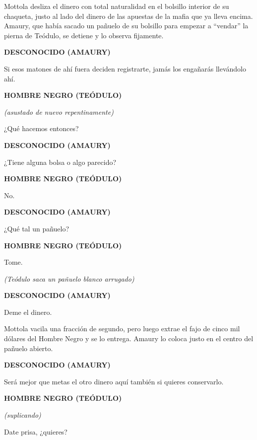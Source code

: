 \documentclass[11pt]{report}
\newenvironment{scenedesc}{\vspace{1em}\par\noindent\small\rmfamily}{\vspace{1em}}
\newenvironment{dialogue}[1]{
    \vspace{0.5em}\par\begin{center}\textbf{\MakeUppercase{#1}}\end{center}\vspace{-0.5em}
    \begin{list}{}{
        \leftmargin=1.5in
        \rightmargin=1.5in
        \parsep=0pt
    }\item[]
}{
    \end{list}\vspace{0.5em}
}
\newcommand{\parenthetical}[1]{\vspace{-0.3em}\begin{center}\textit{(#1)}\end{center}\vspace{-0.3em}}
\begin{document}
\begin{scenedesc}
Mottola desliza el dinero con total naturalidad en el bolsillo interior de su chaqueta, justo al lado del dinero de las apuestas de la mafia que ya lleva encima. Amaury, que había sacado un pañuelo de su bolsillo para empezar a ``vendar'' la pierna de Teódulo, se detiene y lo observa fijamente.
\end{scenedesc}

\begin{dialogue}{Desconocido (Amaury)}
Si esos matones de ahí fuera deciden registrarte, jamás los engañarás llevándolo ahí.
\end{dialogue}

\begin{dialogue}{Hombre Negro (Teódulo)}
\parenthetical{asustado de nuevo repentinamente}
¿Qué hacemos entonces?
\end{dialogue}

\begin{dialogue}{Desconocido (Amaury)}
¿Tiene alguna bolsa o algo parecido?
\end{dialogue}

\begin{dialogue}{Hombre Negro (Teódulo)}
No.
\end{dialogue}

\begin{dialogue}{Desconocido (Amaury)}
¿Qué tal un pañuelo?
\end{dialogue}

\begin{dialogue}{Hombre Negro (Teódulo)}
Tome.
\parenthetical{Teódulo saca un pañuelo blanco arrugado}
\end{dialogue}

\begin{dialogue}{Desconocido (Amaury)}
Deme el dinero.
\end{dialogue}

\begin{scenedesc}
Mottola vacila una fracción de segundo, pero luego extrae el fajo de cinco mil dólares del Hombre Negro y se lo entrega. Amaury lo coloca justo en el centro del pañuelo abierto.
\end{scenedesc}

\begin{dialogue}{Desconocido (Amaury)}
Será mejor que metas el otro dinero aquí también si quieres conservarlo.
\end{dialogue}

\begin{dialogue}{Hombre Negro (Teódulo)}
\parenthetical{suplicando}
Date prisa, ¿quieres?
\end{dialogue}
\end{document}
